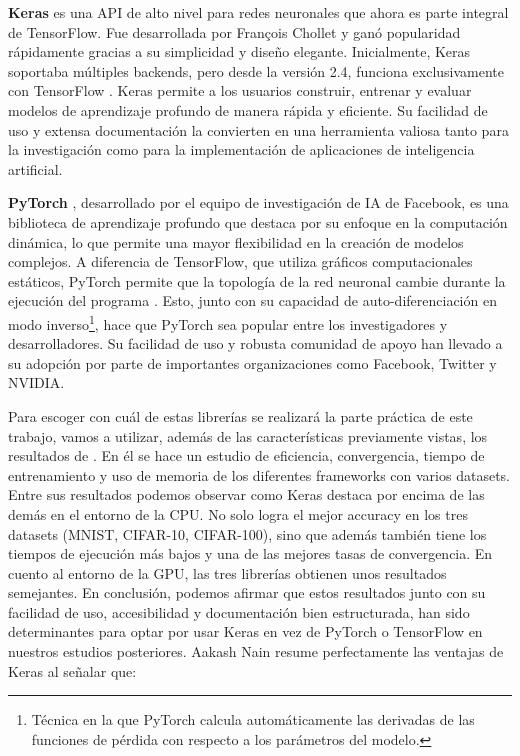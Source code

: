 \textbf{Keras} \citep{keras} es una API de alto nivel para redes neuronales que ahora es parte integral de TensorFlow. Fue desarrollada por François Chollet y ganó popularidad rápidamente gracias a su simplicidad y diseño elegante. Inicialmente, Keras soportaba múltiples backends, pero desde la versión 2.4, funciona exclusivamente con TensorFlow \citep{muller2016introduction}. Keras permite a los usuarios construir, entrenar y evaluar modelos de aprendizaje profundo de manera rápida y eficiente. Su facilidad de uso y extensa documentación la convierten en una herramienta valiosa tanto para la investigación como para la implementación de aplicaciones de inteligencia artificial.



\textbf{PyTorch} \citep{pytorch}, desarrollado por el equipo de investigación de IA de Facebook, es una biblioteca de aprendizaje profundo que destaca por su enfoque en la computación dinámica, lo que permite una mayor flexibilidad en la creación de modelos complejos. A diferencia de TensorFlow, que utiliza gráficos computacionales estáticos, PyTorch permite que la topología de la red neuronal cambie durante la ejecución del programa \citep{mahmoud2019dlbench}. Esto, junto con su capacidad de auto-diferenciación en modo inverso\footnote{Técnica en la que PyTorch calcula automáticamente las derivadas de las funciones de pérdida con respecto a los parámetros del modelo.}, hace que PyTorch sea popular entre los investigadores y desarrolladores. Su facilidad de uso y robusta comunidad de apoyo han llevado a su adopción por parte de importantes organizaciones como Facebook, Twitter y NVIDIA.



Para escoger con cuál de estas librerías se realizará la parte práctica de este trabajo, vamos a utilizar, además de las características previamente vistas, los resultados de \citep{mahmoud2019dlbench}. En él se hace un estudio de eficiencia, convergencia, tiempo de entrenamiento y uso de memoria de los diferentes frameworks con varios datasets. Entre sus resultados podemos observar como Keras destaca por encima de las demás en el entorno de la CPU. No solo logra el mejor accuracy en los tres datasets (MNIST, CIFAR-10, CIFAR-100), sino que además también tiene los tiempos de ejecución más bajos y una de las mejores tasas de convergencia. En cuento al entorno de la GPU, las tres librerías obtienen unos resultados semejantes. En conclusión, podemos afirmar que estos resultados junto con su facilidad de uso, accesibilidad y documentación bien estructurada, han sido determinantes para optar por usar Keras en vez de PyTorch o TensorFlow en nuestros estudios posteriores. Aakash Nain resume perfectamente las ventajas de Keras \citep{keraswebsite2} al señalar que:

